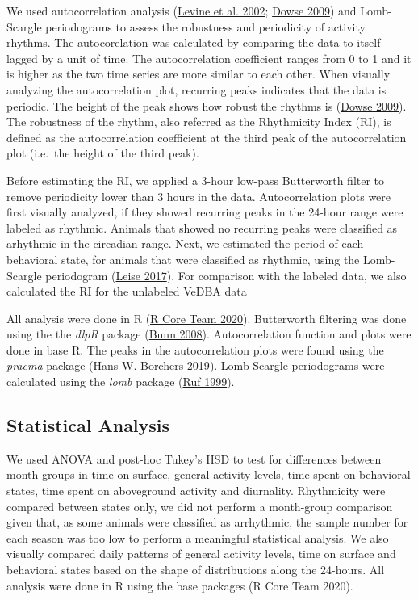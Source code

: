 \documentclass[msc,numbers,hidelinks]{coppe}
\begin{document}
  We used autocorrelation analysis (\protect\hyperlink{ref-levine2002}{Levine et al. 2002}; \protect\hyperlink{ref-dowse2009}{Dowse 2009}) and Lomb-Scargle periodograms to assess the robustness and periodicity of activity rhythms. The autocorelation was calculated by comparing the data to itself lagged by a unit of time. The autocorrelation coefficient ranges from 0 to 1 and it is higher as the two time series are more similar to each other. When visually analyzing the autocorrelation plot, recurring peaks indicates that the data is periodic. The height of the peak shows how robust the rhythms is (\protect\hyperlink{ref-dowse2009}{Dowse 2009}). The robustness of the rhythm, also referred as the Rhythmicity Index (RI), is defined as the autocorrelation coefficient at the third peak of the autocorrelation plot (i.e.~the height of the third peak).

  Before estimating the RI, we applied a 3-hour low-pass Butterworth filter to remove periodicity lower than 3 hours in the data. Autocorrelation plots were first visually analyzed, if they showed recurring peaks in the 24-hour range were labeled as rhythmic. Animals that showed no recurring peaks were classified as arhythmic in the circadian range. Next, we estimated the period of each behavioral state, for animals that were classified as rhythmic, using the Lomb-Scargle periodogram (\protect\hyperlink{ref-leise2017}{Leise 2017}). For comparison with the labeled data, we also calculated the RI for the unlabeled VeDBA data

  All analysis were done in R (\protect\hyperlink{ref-rcoreteam2020}{R Core Team 2020}). Butterworth filtering was done using the the \emph{dlpR} package (\protect\hyperlink{ref-bunn2008}{Bunn 2008}). Autocorrelation function and plots were done in base R. The peaks in the autocorrelation plots were found using the \emph{pracma} package (\protect\hyperlink{ref-hansw.borchers2019}{Hans W. Borchers 2019}). Lomb-Scargle periodograms were calculated using the \emph{lomb} package (\protect\hyperlink{ref-ruf1999}{Ruf 1999}).

  \hypertarget{statistical-analysis}{%
  \subsection{Statistical Analysis}\label{statistical-analysis}}

  We used ANOVA and post-hoc Tukey's HSD to test for differences between month-groups in time on surface, general activity levels, time spent on behavioral states, time spent on aboveground activity and diurnality. Rhythmicity were compared between states only, we did not perform a month-group comparison given that, as some animals were classified as arrhythmic, the sample number for each season was too low to perform a meaningful statistical analysis. We also visually compared daily patterns of general activity levels, time on surface and behavioral states based on the shape of distributions along the 24-hours. All analysis were done in R using the base packages (R Core Team 2020).
\end{document}

